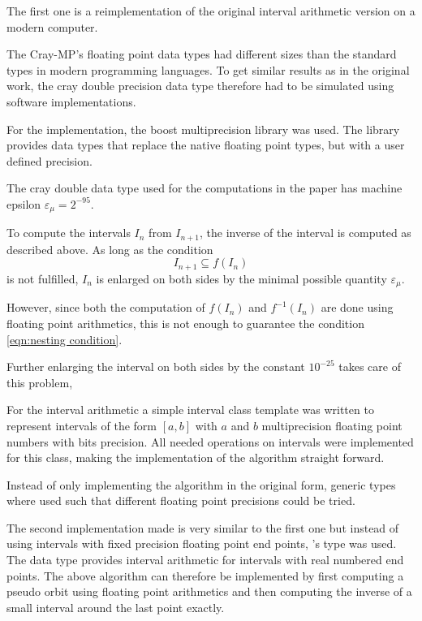   The first one is a reimplementation of the original interval arithmetic version
  on a modern computer.
  
  The Cray-MP's floating point data types had different sizes than the
  standard types in modern programming languages.
  To get similar results as
  in the original work,  the cray double precision data type therefore had to be
  simulated using software implementations.
  
  For the \cc implementation, the boost multiprecision library \cite{boostmultiprecision} was used. 
  The library provides data types that replace the native \cc floating point types, but with a user defined precision. 
 
  The cray double data type used for the computations in the paper has machine epsilon
  $\varepsilon_\mu = 2^{-95}$.

  To compute the intervals $I_n$ from $I_{n+1}$, the inverse of the interval is
  computed as described above. 
  As long as the condition 
  \begin{equation}\label{eqn:nesting condition}  
    I_{n+1} \subseteq f(I_n) 
  \end{equation}
  is not fulfilled, $I_n$ is enlarged on both sides by the minimal possible quantity $\varepsilon_\mu$. 

  However, since both the computation of $f(I_n)$ and $f^{-1}(I_n)$ are done using
  floating point arithmetics, this is not enough to guarantee the condition
  \ref{eqn:nesting condition}.
  
  Further enlarging the interval on both sides by the constant $10^{-25}$
  takes care of this problem,
  
  For the interval arithmetic a simple interval class template
   was written to represent
  intervals of the form $[a,b]$ with $a$ and $b$ multiprecision floating point
  numbers with  bits precision. 
  All needed operations on intervals were implemented for this class, making
  the implementation of the algorithm straight forward.

  Instead of only implementing the algorithm in the original form, generic
  types where used such that different floating point precisions could be
  tried.

  The second implementation made is very similar to the first one but instead
  of using intervals with fixed precision floating point end points, \irram's
   type was used.
  The data type provides interval arithmetic for intervals with real numbered end points. 
  The above algorithm can therefore be implemented by first computing a pseudo
  orbit using floating point arithmetics and then computing the inverse of a
  small interval around the last point exactly.

